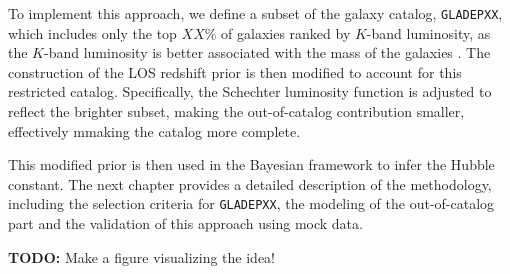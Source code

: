 To implement this approach, we define a subset of the galaxy catalog, \texttt{GLADEPXX}, which includes only the top $XX\%$ of galaxies ranked by $K$-band luminosity, as the $K$-band luminosity is better associated with the mass of the galaxies \citep{strazzullo2006near,sureshkumar2021galaxy}. The construction of the LOS redshift prior is then modified to account for this restricted catalog. Specifically, the Schechter luminosity function is adjusted to reflect the brighter subset, making the out-of-catalog contribution smaller, effectively mmaking the catalog more complete.

This modified prior is then used in the Bayesian framework to infer the Hubble constant. The next chapter provides a detailed description of the methodology, including the selection criteria for \texttt{GLADEPXX}, the modeling of the out-of-catalog part and the validation of this approach using mock data.

\textbf{TODO:} Make a figure visualizing the idea!